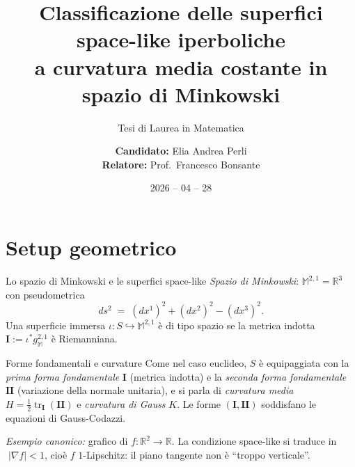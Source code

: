 \documentclass[aspectratio=169,11pt]{beamer}
\title{Classificazione delle superfici space-like iperboliche\\ a curvatura media costante in spazio di Minkowski}
\subtitle{Tesi di Laurea in Matematica}
\author{\centering \textbf{Candidato:} Elia Andrea Perli\\
        \textbf{Relatore:} Prof.\ Francesco Bonsante}
\institute{Università degli Studi di Pavia}
\date{2026 -- 04 -- 28}
\newcommand{\tr}{\operatorname{tr}}
\newcommand{\R}{\mathbb{R}}
\newcommand{\M}{\mathbb{M}^{2,1}}
\newcommand{\Iff}{\mathbf{I}}
\newcommand{\IIff}{\mathbf{II}}
\begin{document}
\begin{frame}
  \titlepage
\end{frame}


\section{Setup geometrico}

\begin{frame}[t]{Lo spazio di Minkowski e le superfici space-like}
  \emph{Spazio di Minkowski}: $\M=\R^3$ con pseudometrica
  \[
    ds^2 \;=\; (dx^1)^2+(dx^2)^2-(dx^3)^2.
  \]
  Una superficie immersa $\iota:S\hookrightarrow\M$ è \alert{di tipo
  spazio} se la metrica indotta $\Iff:=\iota^* g_\M$ è Riemanniana.

  \vspace{2mm}
  \begin{block}{Forme fondamentali e curvature}
    Come nel caso euclideo, $S$ è equipaggiata con la \emph{prima
    forma fondamentale} $\Iff$ (metrica indotta) e la \emph{seconda
    forma fondamentale} $\IIff$ (variazione della normale unitaria),
    e si parla di \emph{curvatura media} $H=\tfrac12\tr_{\Iff}(\IIff)$ e
    \emph{curvatura di Gauss} $K$. Le forme $(\Iff,\IIff)$ soddisfano
    le equazioni di \alert{Gauss-Codazzi}.
  \end{block}

  \vspace{2mm}
  \emph{Esempio canonico:} grafico di $f:\R^2\to\R$. La condizione
  space-like si traduce in $\;|\nabla f|<1$, cioè $f$
  \alert{$1$-Lipschitz}: il piano tangente non è ``troppo verticale''.
\end{frame}
\end{document}
